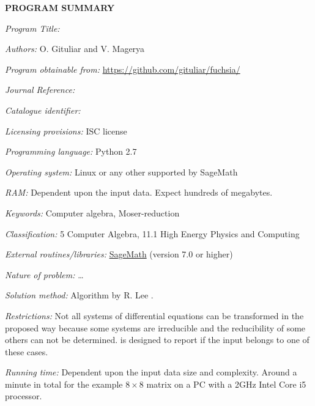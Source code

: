 {\bf PROGRAM SUMMARY}

\begin{small}
\noindent

{\em Program Title:}
    \fuchsia{}

{\em Authors:}
    O. Gituliar and V. Magerya

{\em Program obtainable from:}
    \url{https://github.com/gituliar/fuchsia/}

{\em Journal Reference:}

{\em Catalogue identifier:}

{\em Licensing provisions:}
    ISC license

{\em Programming language:}
    Python 2.7

{\em Operating system:}
    Linux or any other supported by SageMath

{\em RAM:}
    Dependent upon the input data. Expect hundreds of megabytes.

{\em Keywords:}
    Computer algebra, Moser-reduction

{\em Classification:}
    5 Computer Algebra, 11.1 High Energy Physics and Computing

{\em External routines/libraries:}
    \href{http://www.sagemath.org/}{SageMath} (version 7.0 or higher)

{\em Nature of problem:}
    \ldots{}

{\em Solution method:}
    Algorithm by R. Lee \cite{Lee15}.

{\em Restrictions:}
    Not all systems of differential equations can be transformed
    in the proposed way because some systems are irreducible
    and the reducibility of some others can not be determined.
    \fuchsia{} is designed to report if the input belongs to
    one of these cases.

{\em Running time:}
    Dependent upon the input data size and complexity. Around
    a minute in total for the example $8\times8$ matrix on a PC
    with a 2GHz Intel Core i5 processor.

\end{small}
